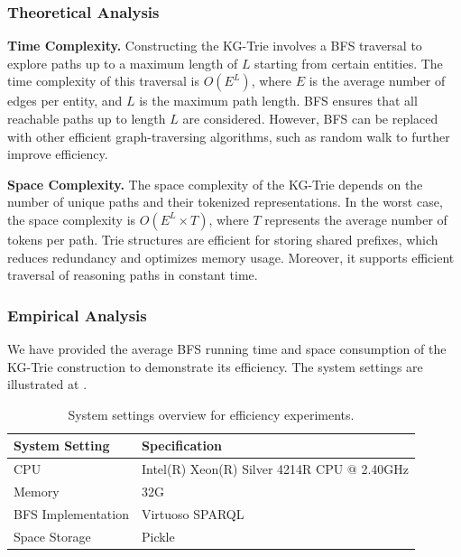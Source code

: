 {    \subsubsection{Theoretical Analysis}
    \noindent\textbf{Time Complexity.}  Constructing the KG-Trie involves a BFS traversal to explore paths up to a maximum length of $L$ starting from certain entities. The time complexity of this traversal is $O(E^{L})$, where $E$ is the average number of edges per entity, and $L$ is the maximum path length. BFS ensures that all reachable paths up to length $L$ are considered. However, BFS can be replaced with other efficient graph-traversing algorithms, such as random walk \citep{xia2019random} to further improve efficiency.

    \noindent\textbf{Space Complexity.} The space complexity of the KG-Trie depends on the number of unique paths and their tokenized representations. In the worst case, the space complexity is $O(E^L \times T)$, where $T$ represents the average number of tokens per path. Trie structures are efficient for storing shared prefixes, which reduces redundancy and optimizes memory usage. Moreover, it supports efficient traversal of reasoning paths in constant time.

    \subsubsection{Empirical Analysis}
    We have provided the average BFS running time and space consumption of the KG-Trie construction to demonstrate its efficiency. The system settings are illustrated at .

    \begin{table}[h!]
        \centering
        \caption{System settings overview for efficiency experiments.}\label{tab:system_settings}
        \begin{tabular}{@{}l|l@{}}
            \toprule
            System Setting     & Specification                               \\
            \midrule
            CPU                & Intel(R) Xeon(R) Silver 4214R CPU @ 2.40GHz \\
            \midrule
            Memory             & 32G                                         \\
            \midrule
            BFS Implementation & Virtuoso SPARQL                                    \\
            \midrule
            Space Storage      & Pickle                                      \\
            \bottomrule
        \end{tabular}
    \end{table}

}
